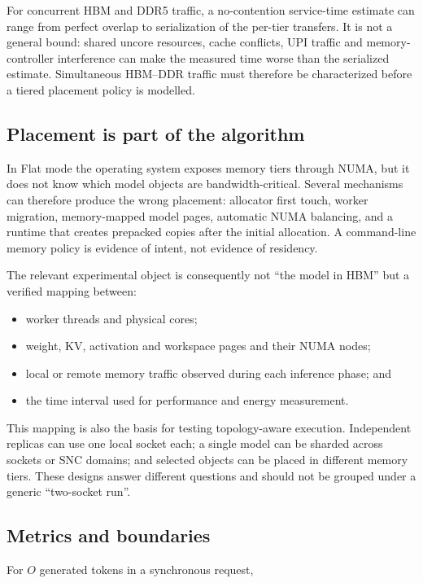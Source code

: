 For concurrent HBM and DDR5 traffic, a no-contention service-time
estimate can range from perfect overlap to serialization of the
per-tier transfers.  It is not a general bound: shared uncore resources,
cache conflicts, UPI traffic and memory-controller interference can make
the measured time worse than the serialized estimate.  Simultaneous
HBM--DDR traffic must therefore be characterized before a tiered
placement policy is modelled.

\subsection{Placement is part of the algorithm}

In Flat mode the operating system exposes memory tiers through NUMA,
but it does not know which model objects are bandwidth-critical.
Several mechanisms can therefore produce the wrong placement:
allocator first touch, worker migration, memory-mapped model pages,
automatic NUMA balancing, and a runtime that creates prepacked copies
after the initial allocation.  A command-line memory policy is evidence
of intent, not evidence of residency.

The relevant experimental object is consequently not ``the model in
HBM'' but a verified mapping between:

\begin{itemize}
  \item worker threads and physical cores;
  \item weight, KV, activation and workspace pages and their NUMA nodes;
  \item local or remote memory traffic observed during each inference
        phase; and
  \item the time interval used for performance and energy measurement.
\end{itemize}

This mapping is also the basis for testing topology-aware execution.
Independent replicas can use one local socket each; a single model can
be sharded across sockets or SNC domains; and selected objects can be
placed in different memory tiers.  These designs answer different
questions and should not be grouped under a generic ``two-socket run''.

\subsection{Metrics and boundaries}

For \(O\) generated tokens in a synchronous request,

